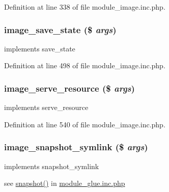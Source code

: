 Definition at line 338 of file module\_\-image.inc.php.

\hypertarget{module__image_8inc_8php_ac26ea1448f0b7ed835907cf7c22b60ca}{
\subsubsection[{image\_\-save\_\-state}]{\setlength{\rightskip}{0pt plus 5cm}image\_\-save\_\-state (\$ {\em args})}}
\label{module__image_8inc_8php_ac26ea1448f0b7ed835907cf7c22b60ca}
implements save\_\-state 

Definition at line 498 of file module\_\-image.inc.php.

\hypertarget{module__image_8inc_8php_abb6646bfaa6a012e620cdaaa0bc3c807}{
\subsubsection[{image\_\-serve\_\-resource}]{\setlength{\rightskip}{0pt plus 5cm}image\_\-serve\_\-resource (\$ {\em args})}}
\label{module__image_8inc_8php_abb6646bfaa6a012e620cdaaa0bc3c807}
implements serve\_\-resource 

Definition at line 540 of file module\_\-image.inc.php.

\hypertarget{module__image_8inc_8php_a65d33fafe2da58d0f87f2df1fedbbe62}{
\subsubsection[{image\_\-snapshot\_\-symlink}]{\setlength{\rightskip}{0pt plus 5cm}image\_\-snapshot\_\-symlink (\$ {\em args})}}
\label{module__image_8inc_8php_a65d33fafe2da58d0f87f2df1fedbbe62}
implements snapshot\_\-symlink

see \hyperlink{module__glue_8inc_8php_a5d3ad02088eee566589cd47fe0dc889a}{snapshot()} in \hyperlink{module__glue_8inc_8php}{module\_\-glue.inc.php} 

